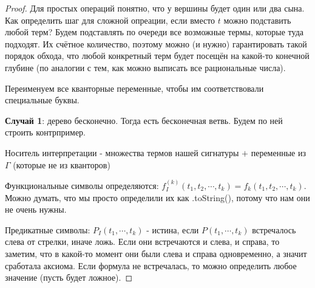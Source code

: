 \begin{proof}

    Для простых операций понятно, что у вершины будет один или два сына. Как определить шаг для сложной опреации, если 
    вместо $t$ можно подставить любой терм? Будем подставлять по очереди все возможные термы, которые туда подходят. 
    Их счётное количество, поэтому можно (и нужно) гарантировать такой порядок обхода, что любой конкретный терм будет посещён на какой-то конечной глубине 
    (по аналогии с тем, как можно выписать все рациональные числа).

    Переименуем все кванторные переменные, чтобы им соответствовали специальные буквы.

    \textbf{Случай 1}: дерево бесконечно. Тогда есть бесконечная ветвь. Будем по ней строить контрпример.

    Носитель интерпретации - множества термов нашей сигнатуры $+$ переменные из $\Gamma$ (которые не из кванторов)

    Функциональные символы определяются: $f^{(k)}_{I}(t_1, t_2, \cdots, t_k) = f_k(t_1, t_2, \cdots, t_k)$. Можно думать, 
    что мы просто определили их как .toString(), потому что нам они не очень нужны.

    Предикатные символы: $P_I(t_1, \cdots, t_k)$ - истина, если $P(t_1, \cdots, t_k)$ встречалось слева от стрелки, иначе ложь.
    Если они встречаются и слева, и справа, то заметим, что в какой-то момент они были слева и справа одновременно, а значит сработала аксиома.
    Если формула не встречалась, то можно определить любое значение (пусть будет ложное).


\end{proof}
